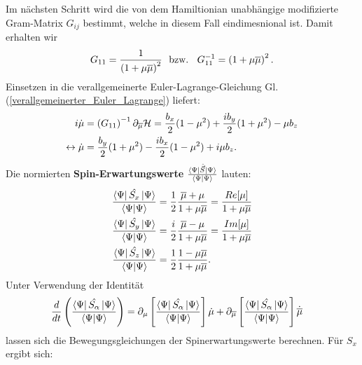 \noindent Im nächsten Schritt wird die von dem Hamiltionian unabhängige modifizierte Gram-Matrix $G_{ij}$ bestimmt, 
welche in diesem Fall eindimesnional ist.
Damit erhalten wir
\begin{align}
    G_{11} = \frac{1}{\left(1 + \mu\overline{\mu}\right)^2} \text{\space\space bzw.\space\space } G_{11}^{-1} = \left(1 + \mu\overline{\mu}\right)^2 .
\end{align}
\noindent Einsetzen in die verallgemeinerte Euler-Lagrange-Gleichung Gl. (\ref{verallgemeinerter_Euler_Lagrange}) liefert:
\begin{align}
    i\dot{\mu} &=  \left(G_{11}\right)^{-1}\partial_{\overline{\mu}} \mathcal{H} = \frac{b_x}{2}(1-\mu^2) + \frac{i b_y }{2}(1+\mu^2) -\mu b_z\label{Larmor}\\
    \leftrightarrow \dot{\mu} &= \frac{ b_y }{2}(1+\mu^2) - \frac{ib_x}{2}(1-\mu^2)   + i\mu b_z .
\end{align}
Die normierten \textbf{Spin-Erwartungswerte} $\frac{\bra{\Psi}\hat{\vec{S}}\ket{\Psi}}{\bra{\Psi}\ket{\Psi}}$ lauten:
\begin{align}
    \frac{\bra{\Psi}\hat{S_x}\ket{\Psi}}{\bra{\Psi}\ket{\Psi}} &= \frac{1}{2}\frac{\overline{\mu} + \mu}{1+\mu\overline{\mu}} = \frac{Re[\mu]}{1 + \mu\overline{\mu}} \\
    \frac{\bra{\Psi}\hat{S_y}\ket{\Psi}}{\bra{\Psi}\ket{\Psi}} &= \frac{i}{2}\frac{\overline{\mu} - \mu}{1+\mu\overline{\mu}} = \frac{Im[\mu]}{1 + \mu\overline{\mu}} \\
    \frac{\bra{\Psi}\hat{S_z}\ket{\Psi}}{\bra{\Psi}\ket{\Psi}} &= \frac{1}{2}\frac{1 - \mu\overline{\mu}}{1 + \mu\overline{\mu}}  .
\end{align}
Unter Verwendung der Identität 
\begin{align}
    \frac{d}{dt}\left(\frac{\bra{\Psi}\hat{S_\alpha}\ket{\Psi}}{\bra{\Psi}\ket{\Psi}}\right) &= \partial_{\mu}\left[\frac{\bra{\Psi}\hat{S_\alpha}\ket{\Psi}}{\bra{\Psi}\ket{\Psi}}\right]\dot{\mu} 
    + \partial_{\overline{\mu}}\left[\frac{\bra{\Psi}\hat{S_\alpha}\ket{\Psi}}{\bra{\Psi}\ket{\Psi}}\right]\dot{\overline{\mu}}\label{dS_dt}
\end{align}
lassen sich die Bewegungsgleichungen der Spinerwartungswerte berechnen. Für $S_x$ ergibt sich:
